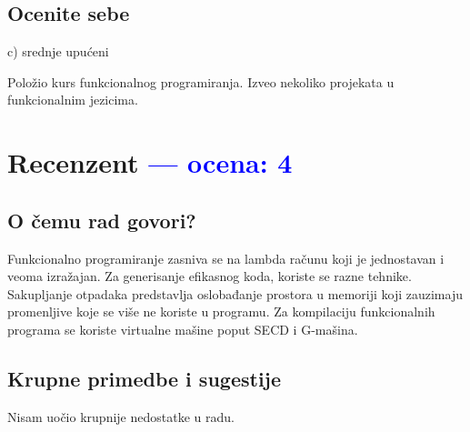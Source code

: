 \documentclass[a4paper]{report}
\newcommand{\odgovor}[1]{\textcolor{blue}{#1}}
\begin{document}
\section{Ocenite sebe}
c) srednje upućeni


Položio kurs funkcionalnog programiranja. Izveo nekoliko projekata u funkcionalnim jezicima.

\chapter{Recenzent \odgovor{---  ocena: 4} }


\section{O čemu rad govori?}
Funkcionalno programiranje zasniva se na lambda računu koji je jednostavan i veoma izražajan.  Za generisanje efikasnog koda, koriste se razne tehnike. Sakupljanje otpadaka predstavlja oslobađanje prostora u memoriji koji zauzimaju promenljive koje se više ne koriste u programu. Za kompilaciju funkcionalnih programa se koriste virtualne mašine poput SECD i G-mašina.

\section{Krupne primedbe i sugestije}
Nisam uočio krupnije nedostatke u radu.
\end{document}

